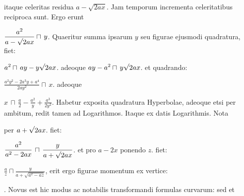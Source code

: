 itaque celeritas residua
$\displaystyle a - \sqrt{2ax}$.
Jam temporum incrementa celeritatibus reciproca sunt. 
Ergo erunt
\rule[-4mm]{0mm}{10mm}$\displaystyle \frac{a^2}{a - \sqrt{\protect\vphantom{2ax}} 2ax} \sqcap \, y$.
Quaeritur summa ipsarum $\displaystyle y$ seu figurae ejusmodi quadratura, fiet:
\rule[-4mm]{0mm}{10mm}$\displaystyle a^2 \sqcap \, ay - y \sqrt{\protect\vphantom{2ax}} 2ax$.
adeoque
$\displaystyle ay - a^2 \sqcap \, y \sqrt{\protect\vphantom{2ax}} 2ax$.
et quadrando:
\rule[-4mm]{0mm}{10mm}$\displaystyle \frac{a^2y^2 - 2a^3y + a^4}{2ay^2} \sqcap \, x$. adeoque
\rule[-4mm]{0mm}{10mm}$\displaystyle x \, \sqcap \, \frac{a}{2} - \frac{a^2}{y} + \frac{a^3}{2y^2}$.
Habetur  exposita quadratura Hyperbolae, adeoque etsi per ambitum, redit tamen ad Logarithmos. Itaque ex datis  %
Logarithmis.
Nota \rule[-4mm]{0mm}{10mm} per 
$\displaystyle a + \sqrt{\protect\vphantom{2ax}}2ax$.
fiet:
\rule[-4mm]{0mm}{10mm}$\displaystyle \frac{a^2}{a^2 - 2ax} \, \sqcap \, \frac{y}{a + \sqrt{\protect\vphantom{2ax}}2ax}$.
et pro 
$\displaystyle a - 2x$ ponendo $\displaystyle z$.
fiet:
\rule[-4mm]{0mm}{10mm}$\displaystyle \frac{a}{z} \sqcap \frac{y}{a + \sqrt{a^2 - az}}$,
erit ergo figurae momentum ex vertice:
\rule[-4mm]{0mm}{10mm}
{
}. 
Novus est hic modus ac notabilis transformandi formulas curvarum: sed et 
\rule[-4mm]{0mm}{10mm} 
